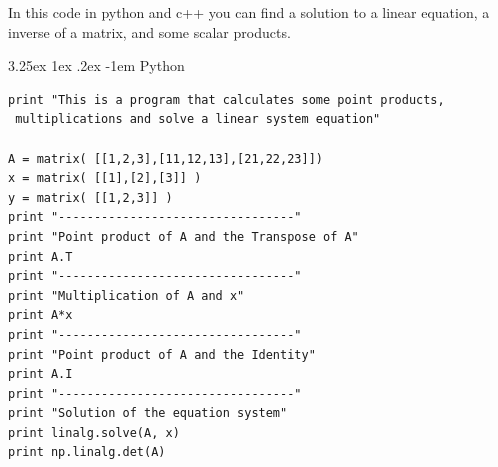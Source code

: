 \documentclass{article}
\makeatletter
\renewcommand\paragraph{\@startsection{paragraph}{5}{\z@}%
  {3.25ex \@plus1ex \@minus.2ex}%
  {-1em}%
  {\normalfont\normalsize\bfseries}}
\makeatother
\begin{document}
In this code in python and c++ you can find a solution to a linear equation, a inverse of a matrix, and some scalar products.

\paragraph{Python}
\hfill \break
\begin{lstlisting}
print "This is a program that calculates some point products,
 multiplications and solve a linear system equation"

A = matrix( [[1,2,3],[11,12,13],[21,22,23]])
x = matrix( [[1],[2],[3]] )
y = matrix( [[1,2,3]] )
print "---------------------------------"
print "Point product of A and the Transpose of A"
print A.T
print "---------------------------------"
print "Multiplication of A and x"
print A*x
print "---------------------------------"
print "Point product of A and the Identity"
print A.I
print "---------------------------------"
print "Solution of the equation system"
print linalg.solve(A, x)
print np.linalg.det(A)
\end{lstlisting}
\end{document}
